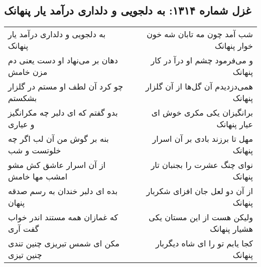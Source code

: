 \begin{center}
\section*{غزل شماره ۱۳۱۴: به دلجویی و دلداری درآمد یار پنهانک}
\label{sec:1314}
\begin{longtable}{l p{0.5cm} r}
به دلجویی و دلداری درآمد یار پنهانک
&&
شب آمد چون مه تابان شه خون خوار پنهانک
\\
دهان بر می‌نهاد او دست یعنی دم مزن خامش
&&
و می‌فرمود چشم او درآ در کار پنهانک
\\
چو کرد آن لطف او مستم در گلزار بشکستم
&&
همی‌دزدیدم آن گل‌ها از آن گلزار پنهانک
\\
بدو گفتم که ای دلبر چه مکرانگیز و عیاری
&&
برانگیزان یکی مکری خوش ای عیار پنهانک
\\
بنه بر گوش من آن لب اگر چه خلوتست و شب
&&
مهل تا برزند بادی بر آن اسرار پنهانک
\\
از آن اسرار عاشق کش مشو امشب مها خامش
&&
نوای چنگ عشرت را بجنبان تار پنهانک
\\
بده ای دلبر خندان به رسم صدقه پنهان
&&
از آن دو لعل جان افزای شکربار پنهانک
\\
که غمازان همه مستند اندر خواب گفت آری
&&
ولیکن هست از این مستان یکی هشیار پنهانک
\\
مکن ای شمس تبریزی چنین تندی چنین تیزی
&&
کجا یابم تو را ای شاه دیگربار پنهانک
\\
\end{longtable}
\end{center}

